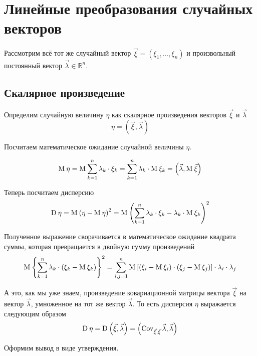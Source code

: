 \section{Линейные преобразования случайных векторов}
\label{section:linearTransformations}

Рассмотрим всё тот же случайный вектор $\vec{\xi} = \left( \xi_1, \dots, \xi_n
\right)$ и произвольный постоянный вектор $\vec{\lambda} \in \mathbb{R}^n$.

\subsection{Скалярное произведение}
Определим случайную величину $\eta$ как скалярное произведения векторов
$\vec{\xi}$ и $\vec{\lambda}$
$$\eta = \left( \vec{\xi}, \vec{\lambda} \right)$$

Посчитаем математическое ожидание случайной величины $\eta$.

\begin{equation}\label{eq:scalarMulMean}
  \operatorname{M}_{} \eta
      = \operatorname{M}_{} \sum_{k=1}^{n} \lambda_k \cdot \xi_k
      = \sum_{k=1}^{n} \lambda_k \cdot \operatorname{M}_{} \xi_k
      = \left( \vec{\lambda}, \operatorname{M}_{} \vec{\xi} \right)
\end{equation}

Теперь посчитаем дисперсию
$$\operatorname{D}_{} \eta
  = \operatorname{M}_{} \left( \eta - \operatorname{M}_{} \eta \right)^2
  = \operatorname{M}_{} \left( \sum_{k=1}^{n} \lambda_k \cdot \xi_k
      - \lambda_k \cdot \operatorname{M}_{} \xi_k \right)^2$$

Полученное выражение сворачивается в математическое ожидание квадрата суммы,
которая превращается в двойную сумму произведений
$$\operatorname{M}_{} \left\{ \sum_{k=1}^{n} \lambda_k
  \cdot \left( \xi_k - \operatorname{M}_{} \xi_k \right) \right\}^2
  = \sum_{i,j=1}^{n}\operatorname{M}_{} \left[ \left( \xi_i - \operatorname{M}_{} \xi_i \right)
      \cdot \left( \xi_j - \operatorname{M}_{} \xi_j \right) \right]
      \cdot \lambda_i \cdot \lambda_j$$

А это, как мы уже знаем, %
произведение ковариационной матрицы вектора $\vec{\xi}$
на вектор $\vec{\lambda}$, умноженное на тот же вектор $\vec{\lambda}$.
То есть дисперсия $\eta$ выражается следующим образом
\begin{equation}\label{eq:linearQuadraticForm}
\operatorname{D}_{} \eta
  = \operatorname{D}_{} \left( \vec{\xi}, \vec{\lambda} \right)
  = \left( \operatorname{Cov}^{}_{\vec{\xi}, \vec{\xi}} \vec{\lambda}, \vec{\lambda} \right)
\end{equation}

Оформим вывод в виде утверждения.

